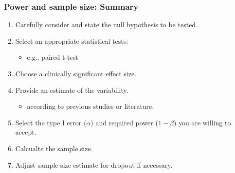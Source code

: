 \documentclass[table,10pt]{beamer}
\begin{document}
\begin{CJK*}{UTF8}{gbsn}
\begin{frame}[t]
\frametitle{Power and sample size: Summary}
\begin{enumerate}[<+->]
	\item Carefully consider and state the null hypothesis to be tested.
	\item Select an appropriate statistical tests:
	\begin{itemize}
		\item e.g., paired t-test
	\end{itemize}
	\item Choose a clinically significant effect size.
	\item Provide an estimate of the variability.
	\begin{itemize}
		\item according to previous studies or literature.
	\end{itemize}
 	\item Select the type I error ($\alpha$) and required power ($1-\beta$) you 
		are willing to accept.
	\item Calcualte the sample size.
	\item Adjust sample size estimate for dropout if necessary.
\end{enumerate}
\end{frame}

\end{CJK*}
\end{document}
